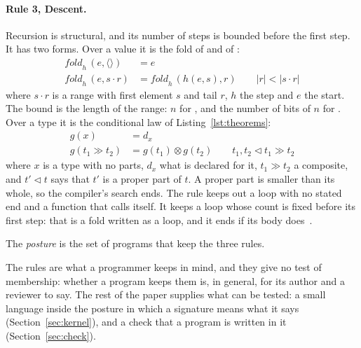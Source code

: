 \paragraph{Rule 3, Descent.}
\label{def:rule3}
Recursion is structural, and its number of steps is bounded before the first step.
It has two forms.
Over a value it is the fold of  and of :
\begin{equation}
\label{eq:fold}
\begin{aligned}
\mathit{fold}_h\,(e, \langle\rangle) &= e \\
\mathit{fold}_h\,(e, s \cdot r) &= \mathit{fold}_h\,(h(e, s), r) \qquad |r| < |s \cdot r|
\end{aligned}
\end{equation}
where $s \cdot r$ is a range with first element $s$ and tail $r$, $h$ the step and $e$ the start.
The bound is the length of the range: $n$ for , and the number of bits of $n$ for .
Over a type it is the conditional law of Listing~\ref{lst:theorems}:
\begin{equation}
\label{eq:cata}
\begin{aligned}
g(x) &= d_x \\
g(t_1 \gg t_2) &= g(t_1) \otimes g(t_2) \qquad t_1, t_2 \triangleleft t_1 \gg t_2
\end{aligned}
\end{equation}
where $x$ is a type with no parts, $d_x$ what is declared for it, $t_1 \gg t_2$ a composite, and $t' \triangleleft t$ says that $t'$ is a proper part of $t$.
A proper part is smaller than its whole, so the compiler's search ends.
The rule keeps out a loop with no stated end and a function that calls itself.
It keeps a loop whose count is fixed before its first step: that is a fold written as a loop, and it ends if its body does~\cite{meyer1967loop}.

\begin{definition}
\label{def:posture}
The \emph{posture} is the set of  programs that keep the three rules.
\end{definition}

\noindent The rules are what a programmer keeps in mind, and they give no test of membership: whether a program keeps them is, in general, for its author and a reviewer to say.
The rest of the paper supplies what can be tested: a small language inside the posture in which a signature means what it says (Section~\ref{sec:kernel}), and a check that a program is written in it (Section~\ref{sec:check}).
